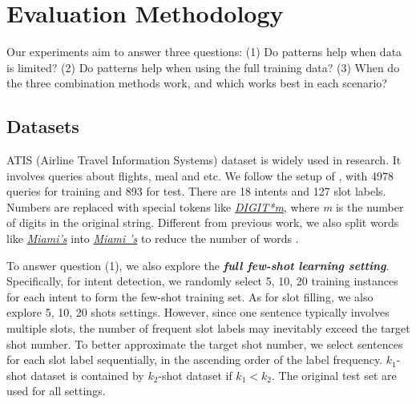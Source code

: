 \section{Evaluation Methodology}
Our experiments aim to answer three questions: (1) Do \RE patterns help when data is limited? (2) Do \RE patterns help when using the full training data? (3) When do the three combination methods work, and which works best in each scenario?

\subsection{Datasets}
\label{sec_datasest} ATIS (Airline Travel Information Systems) dataset \cite{hemphill1990atis} is widely used in \NLU research. It involves
queries about flights, meal and etc. We follow the setup of \cite{liu2016attention}, with 4978 queries for training and 893 for test. There
are 18 intents and 127 slot labels. Numbers are replaced with special tokens like \textsl{\underline{DIGIT*m}}, where \emph{m} is the
number of digits in the original string. Different from previous work, we also split words like \textsl{\underline{Miami's}} into
\textsl{\underline{Miami 's}}  to reduce the
number of words .

To answer question (1), we also explore the \textbf{\emph{full few-shot learning setting}}. Specifically, for intent detection, we randomly
select 5, 10, 20 training instances for each intent to form the few-shot training set. As for slot filling, we also explore 5, 10, 20 shots
settings. However, since one sentence typically involves multiple slots, the number of frequent slot labels may inevitably exceed the
target shot number. To better approximate the target shot number, we select sentences for each slot label sequentially, in the ascending
order of the label frequency.
$k_1$-shot dataset is contained by $k_2$-shot dataset if $k_1 < k_2$.
The original test set are used for all settings.

